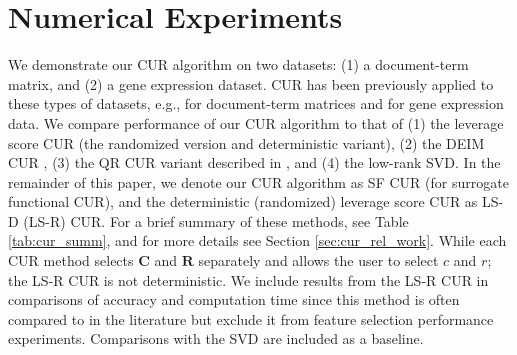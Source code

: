 \documentclass[12pt]{article}
\begin{document}
\section{Numerical Experiments}
\label{sec:exp}

We demonstrate our CUR algorithm on two datasets: (1) a document-term matrix, and (2) a gene expression dataset.  CUR has been previously applied to these types of datasets, e.g., \cite{mahoney_drineas_2009, drineas_etal_2008, sorenson_embree_2016} for document-term matrices and \cite{mahoney_drineas_2009, mairal_etal_2011} for gene expression data.  We compare performance of our CUR algorithm to that of (1) the leverage score CUR \cite{mahoney_drineas_2009} (the randomized version and deterministic variant), (2) the DEIM CUR \cite{sorenson_embree_2016}, (3) the QR CUR variant described in \cite{sorenson_embree_2016}, and (4) the low-rank SVD.  In the remainder of this paper, we denote our CUR algorithm as SF CUR (for surrogate functional CUR), and the deterministic (randomized) leverage score CUR as LS-D (LS-R) CUR.  For a brief summary of these methods, see Table \ref{tab:cur_summ}, and for more details see Section \ref{sec:cur_rel_work}.  While each CUR method selects $\mathbf{C}$ and $\mathbf{R}$ separately and allows the user to select $c$ and $r$; the LS-R CUR is not deterministic.  We include results from the LS-R CUR in comparisons of accuracy and computation time since this method is often compared to in the literature but exclude it from feature selection performance experiments.  Comparisons with the SVD are included as a baseline.
\end{document}
